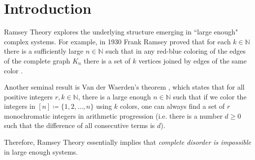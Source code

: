 \section{Introduction}
Ramsey Theory explores the underlying structure emerging in ``large enough" complex systems. For example, in 1930 Frank Ramsey proved that for each \( k \in \mathbb{N}  \) there is a sufficiently large \( n \in \mathbb{N}  \) such that in any red-blue coloring of the edges of the complete graph \( K_{n} \) there is a set of \( k \) vertices joined by edges of the same color \cite{Ramsey30}.

Another seminal result is Van der Waerden's theorem \cite{Waerden27}, which states that for all positive integers \( r, k \in \mathbb{N}  \), there is a large enough \( n \in \mathbb{N}  \) such that if we color the integers in \( [n] \coloneqq \{ 1,2,\hdots ,n \}  \) using \( k \) colors, one can always find a set of \( r \) monochromatic integers in arithmetic progression (i.e. there is a number \( d \geq 0 \) such that the difference of all consecutive terms is \( d \)).

Therefore, Ramsey Theory essentially implies that \emph{complete disorder is impossible} in large enough systems.
